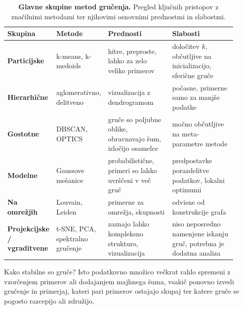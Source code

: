 \begin{table}
  \caption{{\bf Glavne skupine metod gručenja.} Pregled ključnih pristopov z značilnimi metodami ter njihovimi osnovnimi prednostmi in slabostmi.}
  \vspace{2mm}
  \centering
  \small
  \renewcommand{\arraystretch}{1.3}
  \begin{tabular}{
    @{}
    >{\raggedright\arraybackslash}p{0.14\linewidth}
    >{\raggedright\arraybackslash}p{0.22\linewidth}
    >{\raggedright\arraybackslash}p{0.28\linewidth}
    >{\raggedright\arraybackslash}p{0.28\linewidth}
    @{}
  }
  \toprule
  \textbf{Skupina} &
  \textbf{Metode} &
  \textbf{Prednosti} &
  \textbf{Slabosti} \\
  \midrule
  
  \textbf{Particijske} &
  k-means, k-medoids &
  hitre, preproste, lahko za zelo veliko primerov &
  določitev $k$, občutljive na inicializacijo, sferične gruče \\
  
  \textbf{Hierarhične} &
  aglomerativno, delitveno &
  vizualizacija z dendrogramom &
  počasne, primerne samo za manjše podatke \\
  
  \textbf{Gostotne} &
  DBSCAN, OPTICS &
  gruče so poljubne oblike, obravnavajo šum, izločijo osamelce &
  močno občutljive na meta-parametre metode \\
  
  \textbf{Modelne} &
  Gaussove mešanice &
  probabilistične, primeri so lahko uvrščeni v več gruč &
  predpostavke porazdelitve podatkov, lokalni optimumi \\
  
  \textbf{Na omrežjih} &
  Louvain, Leiden &
  primerne za omrežja, skupnosti &
  odvisne od konstrukcije grafa \\
  
  \textbf{Projekcijske / vgraditvene} &
  t-SNE, PCA, spektralno gručenje &
  zaznajo lahko kompleksno strukturo, vizualizacija &
  niso neposredno namenjene iskanju gruč, potrebna je dodatna analiza \\
  
  \bottomrule
  \end{tabular}
  \label{tab:grucenje-skupine}
\end{table}

\begin{exercise}{Kako stabilne so gruče?}
Isto podatkovno množico večkrat rahlo spremeni z vzorčenjem primerov ali dodajanjem majhnega šuma, vsakič ponovno izvedi gručenje in primerjaj, kateri pari primerov ostajajo skupaj ter katere gruče se pogosto razcepijo ali združijo.
\end{exercise}

